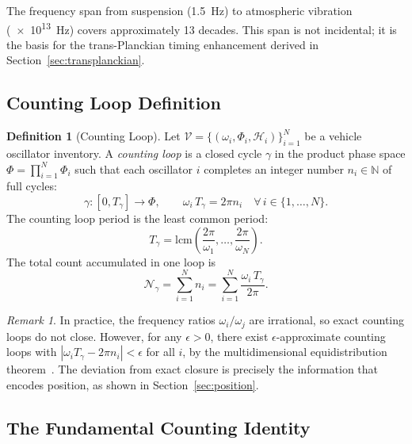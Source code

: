 \documentclass[twocolumn,10pt]{article}
\theoremstyle{definition}
\newtheorem{definition}[theorem]{Definition}
\theoremstyle{remark}
\newtheorem{remark}[theorem]{Remark}
\newcommand{\N}{\mathbb{N}}
\begin{document}
The frequency span from suspension (\SI{1.5}{Hz}) to atmospheric vibration
(\SI{e13}{Hz}) covers approximately 13 decades. This span is not incidental;
it is the basis for the trans-Planckian timing enhancement derived in
Section~\ref{sec:transplanckian}.



\subsection{Counting Loop Definition}

\begin{definition}[Counting Loop]\label{def:counting-loop}
Let $\mathcal{V} = \{(\omega_i, \Phi_i, \mathcal{H}_i)\}_{i=1}^{N}$ be a
vehicle oscillator inventory. A \emph{counting loop} is a closed cycle
$\gamma$ in the product phase space
$\Phi = \prod_{i=1}^N \Phi_i$
such that each oscillator $i$ completes an integer number $n_i \in \N$ of
full cycles:
\begin{equation}\label{eq:counting-loop}
  \gamma: [0, T_\gamma] \to \Phi, \qquad
  \omega_i \, T_\gamma = 2\pi n_i \quad \forall\, i \in \{1, \ldots, N\}.
\end{equation}
The counting loop period is the least common period:
\begin{equation}\label{eq:loop-period}
  T_\gamma = \mathrm{lcm}\!\left(\frac{2\pi}{\omega_1}, \ldots,
  \frac{2\pi}{\omega_N}\right).
\end{equation}
The total count accumulated in one loop is
\begin{equation}\label{eq:total-count}
  \mathcal{N}_\gamma = \sum_{i=1}^{N} n_i = \sum_{i=1}^{N}
  \frac{\omega_i \, T_\gamma}{2\pi}.
\end{equation}
\end{definition}

\begin{remark}\label{rem:rational-approx}
In practice, the frequency ratios $\omega_i / \omega_j$ are irrational, so
exact counting loops do not close. However, for any $\epsilon > 0$, there
exist $\epsilon$-approximate counting loops with $|\omega_i T_\gamma -
2\pi n_i| < \epsilon$ for all $i$, by the multidimensional equidistribution
theorem~\cite{strogatz2000}. The deviation from exact closure is precisely
the information that encodes position, as shown in
Section~\ref{sec:position}.
\end{remark}

\subsection{The Fundamental Counting Identity}
\end{document}
